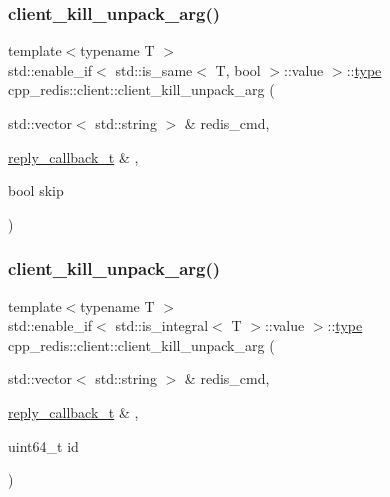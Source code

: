 \subsubsection{\texorpdfstring{client\+\_\+kill\+\_\+unpack\+\_\+arg()}{client\_kill\_unpack\_arg()}\hspace{0.1cm}{\footnotesize\ttfamily [2/4]}}
{\footnotesize\ttfamily template$<$typename T $>$ \\
std\+::enable\+\_\+if$<$ std\+::is\+\_\+same$<$ T, bool $>$\+::value $>$\+::\hyperlink{classcpp__redis_1_1client_ac284ea9a5c0e95d49a675403aaf4847c}{type} cpp\+\_\+redis\+::client\+::client\+\_\+kill\+\_\+unpack\+\_\+arg (\begin{DoxyParamCaption}\item[{std\+::vector$<$ std\+::string $>$ \&}]{redis\+\_\+cmd,  }\item[{\hyperlink{classcpp__redis_1_1client_a061a1140d36d2eaeda82b09a0bb3f9f2}{reply\+\_\+callback\+\_\+t} \&}]{,  }\item[{bool}]{skip }\end{DoxyParamCaption})\hspace{0.3cm}{\ttfamily [private]}}

\mbox{\label{classcpp__redis_1_1client_a903f6271de841721661359c4be055adb}} 
\subsubsection{\texorpdfstring{client\+\_\+kill\+\_\+unpack\+\_\+arg()}{client\_kill\_unpack\_arg()}\hspace{0.1cm}{\footnotesize\ttfamily [3/4]}}
{\footnotesize\ttfamily template$<$typename T $>$ \\
std\+::enable\+\_\+if$<$ std\+::is\+\_\+integral$<$ T $>$\+::value $>$\+::\hyperlink{classcpp__redis_1_1client_ac284ea9a5c0e95d49a675403aaf4847c}{type} cpp\+\_\+redis\+::client\+::client\+\_\+kill\+\_\+unpack\+\_\+arg (\begin{DoxyParamCaption}\item[{std\+::vector$<$ std\+::string $>$ \&}]{redis\+\_\+cmd,  }\item[{\hyperlink{classcpp__redis_1_1client_a061a1140d36d2eaeda82b09a0bb3f9f2}{reply\+\_\+callback\+\_\+t} \&}]{,  }\item[{uint64\+\_\+t}]{id }\end{DoxyParamCaption})\hspace{0.3cm}{\ttfamily [private]}}

